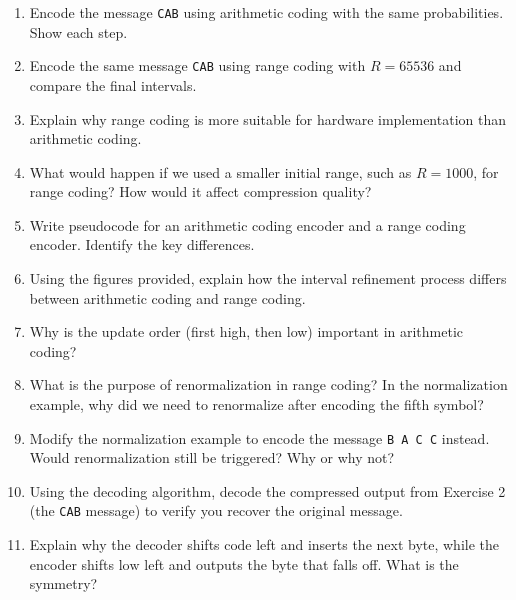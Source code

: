 \documentclass[12pt]{article}
\begin{document}
\begin{enumerate}
    \item Encode the message \texttt{CAB} using arithmetic coding with the same probabilities. Show each step.
    \item Encode the same message \texttt{CAB} using range coding with $R=65536$ and compare the final intervals.
    \item Explain why range coding is more suitable for hardware implementation than arithmetic coding.
    \item What would happen if we used a smaller initial range, such as $R=1000$, for range coding? How would it affect compression quality?
    \item Write pseudocode for an arithmetic coding encoder and a range coding encoder. Identify the key differences.
    \item Using the figures provided, explain how the interval refinement process differs between arithmetic coding and range coding.
    \item Why is the update order (first high, then low) important in arithmetic coding?
    \item What is the purpose of renormalization in range coding? In the normalization example, why did we need to renormalize after encoding the fifth symbol?
    \item Modify the normalization example to encode the message \texttt{B A C C} instead. Would renormalization still be triggered? Why or why not?
    \item Using the decoding algorithm, decode the compressed output from Exercise 2 (the \texttt{CAB} message) to verify you recover the original message.
    \item Explain why the decoder shifts $\text{code}$ left and inserts the next byte, while the encoder shifts $\text{low}$ left and outputs the byte that falls off. What is the symmetry?
\end{enumerate}
\end{document}
